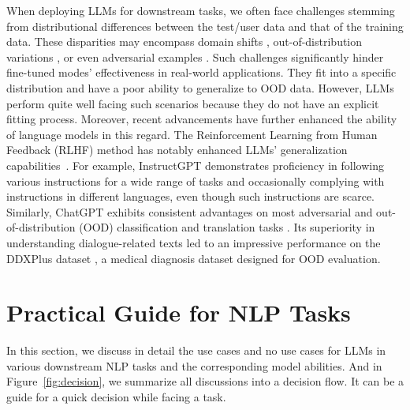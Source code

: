 \documentclass[manuscript,screen, nonacm]{acmart}
\begin{document}
When deploying LLMs for downstream tasks, we often face challenges stemming from distributional differences between the test/user data
and that of the training data. These disparities may encompass domain shifts \cite{zhou2022domain}, out-of-distribution variations \cite{du2022shortcut}, or even adversarial examples \cite{qiu2022adversarial}. 
Such challenges significantly hinder fine-tuned modes' effectiveness in real-world applications. They fit into a specific distribution and have a poor ability to generalize to OOD data. However, LLMs perform quite well facing such scenarios because they do not have an explicit fitting process.
Moreover, recent advancements have further enhanced the ability of language models in this regard.
The Reinforcement Learning from Human Feedback (RLHF) method has notably enhanced LLMs' generalization capabilities~\cite{ouyang2022training}. For example, InstructGPT demonstrates proficiency in following various instructions for a wide range of tasks and occasionally complying with instructions in different languages, even though such instructions are scarce. 
Similarly, ChatGPT exhibits consistent advantages on most adversarial and out-of-distribution (OOD) classification and translation tasks \cite{wang2023robustness}. Its superiority in understanding dialogue-related texts led to an impressive performance on the DDXPlus dataset \cite{tchango2022ddxplus}, a medical diagnosis dataset designed for OOD evaluation.
















\section{Practical Guide for NLP Tasks}
In this section, we discuss in detail the use cases and no use cases for LLMs in various downstream NLP tasks and the corresponding model abilities. And in Figure~\ref{fig:decision}, we summarize all discussions into a decision flow. It can be a guide for a quick decision while facing a task. 
\end{document}
